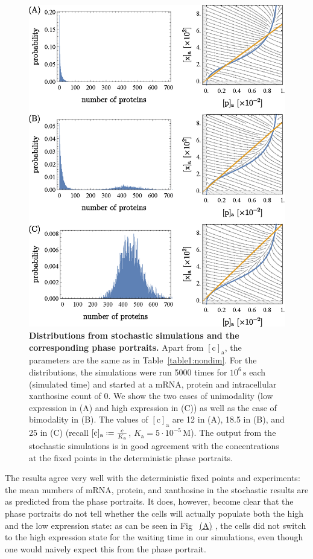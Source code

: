 \documentclass[10pt,letterpaper]{article}
\newcommand{\unit}[1]{\,\mathrm{#1}}
\newcommand{\n}[1]{\mathrm{#1}}
\newcommand*{\defeq}{\mathrel{\vcenter{\baselineskip0.5ex \lineskiplimit0pt
			\hbox{\scriptsize.}\hbox{\scriptsize.}}}%
	=}
\newcommand\subref[2]{%
	\def\myref{\getrefnumber{#1}}%
	\hyperref[#1]{\myref\mbox{#2}}%
}
\begin{document}
\begin{figure}%
	\centering
	\includegraphics[width=1\textwidth]{media/HistogramsC.eps}
	\caption{{\bf Distributions from stochastic simulations and the corresponding phase portraits.}
		Apart from $\n{[c]_a}$, the parameters are the same as in
		Table~\ref{table1:nondim}. For the distributions, the simulations
		were run 5000 times for $10^6 \unit{s}$ each (simulated time) and
		started at a mRNA, protein and intracellular xanthosine count of 0.
		We show the two cases of unimodality (low expression in (A) and high
		expression in (C)) as well as the case of bimodality in (B). The
		values of $\n{[c]_a}$ are 12 in (A), 18.5 in (B), and 25 in (C)
		(recall $\n{[c]_{a}} \defeq \frac{c}{K_{\n{a}}}$, $K_{\n{a}} = 5
		\cdot 10^{-5} \unit{M}$). The output from the stochastic simulations
		is in good agreement with the concentrations at the fixed points in
		the deterministic phase portraits.}
	\label{fig8:stochC}
\end{figure}

The results agree very well with the deterministic fixed points and
experiments: the mean numbers of mRNA, protein, and xanthosine in the
stochastic results are as predicted from the phase portraits. It does,
however, become clear that the phase portraits do not tell whether the cells
will actually populate both the high and the low expression state: as can be
seen in Fig~\subref{fig8:stochC}{(A)}, the cells did not switch to the high
expression state for the waiting time in our simulations, even though one
would naively expect this from the phase portrait.
\end{document}
